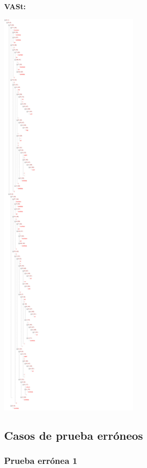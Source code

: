 \documentclass[11pt, , a4paper, titlepage]{article}
\newenvironment{changemargin}[2]{%
\begin{list}{}{%
\setlength{\topsep}{0pt}%
\setlength{\leftmargin}{#1}%
\setlength{\rightmargin}{#2}%
\setlength{\listparindent}{\parindent}%
\setlength{\itemindent}{\parindent}%
\setlength{\parsep}{\parskip}%
}%
\item[]}{\end{list}}
\begin{document}
\begin{changemargin}{+0.5cm}{+0cm}
    \textbf{VASt:}
    \vspace{1mm}
    \begin{center}
        \includegraphics[width=0.5\textwidth]{./resources/test-cases/case-5/tree.jpg}
    \end{center}

\end{changemargin}


\subsection{Casos de prueba erróneos}

\subsubsection{Prueba errónea 1}
\end{document}
